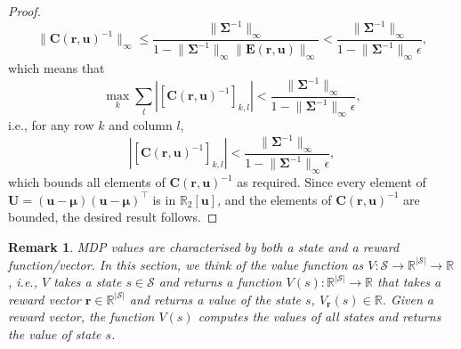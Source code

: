 \documentclass{mpaper}
\newtheorem{remark}[theorem]{Remark}
\newcommand{\V}{V_{\mathbf{r}}}
\begin{document}
\begin{proof}
  \[
    \lVert \mathbf{C}(\mathbf{r}, \mathbf{u})^{-1} \rVert_\infty \le
    \frac{\lVert \bm\Sigma^{-1} \rVert_\infty}{1 - \lVert \bm\Sigma^{-1}
      \rVert_\infty \lVert \mathbf{E}(\mathbf{r}, \mathbf{u}) \rVert_\infty} <
    \frac{\lVert \bm\Sigma^{-1} \rVert_\infty}{1 - \lVert \bm\Sigma^{-1}
      \rVert_\infty \epsilon},
  \]
  which means that
  \[
    \max_k \sum_l \left| [\mathbf{C}(\mathbf{r}, \mathbf{u})^{-1}]_{k,l} \right|
    < \frac{\lVert \bm\Sigma^{-1} \rVert_\infty}{1 - \lVert \bm\Sigma^{-1}
      \rVert_\infty \epsilon},
  \]
  i.e., for any row $k$ and column $l$,
  \[
    \left| [\mathbf{C}(\mathbf{r}, \mathbf{u})^{-1}]_{k,l} \right| <
    \frac{\lVert \bm\Sigma^{-1} \rVert_\infty}{1 - \lVert \bm\Sigma^{-1}
      \rVert_\infty \epsilon},
  \]
  which bounds all elements of $\mathbf{C}(\mathbf{r}, \mathbf{u})^{-1}$ as
  required. Since every element of $\mathbf{U} = (\mathbf{u} - \bm\mu)(\mathbf{u} -
  \bm\mu)^\intercal$ is in $\mathbb{R}_2[\mathbf{u}]$, and the elements of
  $\mathbf{C}(\mathbf{r}, \mathbf{u})^{-1}$ are bounded, the desired result
  follows.
\end{proof}

\begin{remark}
  MDP values are characterised by both a state and a reward function/vector. In
  this section, we think of the value function as $V : \mathcal{S} \to
  \mathbb{R}^{|\mathcal{S}|} \to \mathbb{R}$, i.e., $V$ takes a state $s \in
  \mathcal{S}$ and returns a function $V(s) : \mathbb{R}^{|\mathcal{S}|} \to
  \mathbb{R}$ that takes a reward vector $\mathbf{r} \in
  \mathbb{R}^{|\mathcal{S}|}$ and returns a value of the state $s$, $\V(s) \in
  \mathbb{R}$. Given a reward vector, the function $V(s)$ computes the values of
  all states and returns the value of state $s$.
\end{remark}
\end{document}

